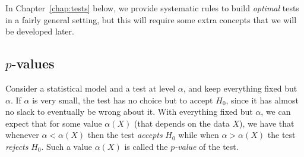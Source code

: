 \documentclass[
	fontsize=11pt, %
	twoside=false, %
	numbers=noenddot, %
]{kaobook}
\begin{document}
In Chapter~\ref{chap:tests} below, we provide systematic rules to build \emph{optimal} tests%
%
in a fairly general setting, but this will require some extra concepts that we will be developed later.

\subsection{$p$-values} %

Consider a statistical model and a test at level $\alpha$, and keep everything 
fixed but $\alpha$.
If $\alpha$ is very small, the test has no choice but to accept $H_0$, since it has almost no slack to eventually be wrong about it.%
With everything fixed but $\alpha$, we can expect that for some value $\alpha(X)$ (that depends on the data $X$), we have that whenever $\alpha < \alpha(X)$ then the test \emph{accepts} $H_0$ while when $\alpha > \alpha(X)$ the test \emph{rejects} $H_0$.
Such a value $\alpha(X)$ is called the \emph{$p$-value} of the test.
\end{document}
